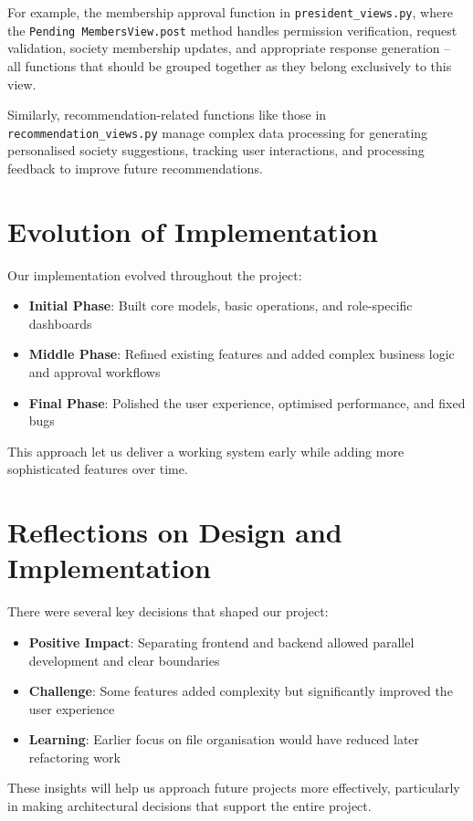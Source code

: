 For example, the membership approval function in \texttt{president\_views.py}, where the \texttt{Pending
MembersView.post} method handles permission verification, request validation, society membership updates, and appropriate response generation – all functions that should be grouped together as they belong exclusively to this view.

Similarly, recommendation-related functions like those in \texttt{recommendation\_views.py} manage complex data processing for generating personalised society suggestions, tracking user interactions, and processing feedback to improve future recommendations.

\section{Evolution of Implementation}

Our implementation evolved throughout the project:

\begin{itemize}
    \item \textbf{Initial Phase}: Built core models, basic operations, and role-specific dashboards
    \item \textbf{Middle Phase}: Refined existing features and added complex business logic and approval workflows
    \item \textbf{Final Phase}: Polished the user experience, optimised performance, and fixed bugs
\end{itemize}

This approach let us deliver a working system early while adding more sophisticated features over time.

\section{Reflections on Design and Implementation}

There were several key decisions that shaped our project:

\begin{itemize}
    \item \textbf{Positive Impact}: Separating frontend and backend allowed parallel development and clear boundaries
    \item \textbf{Challenge}: Some features added complexity but significantly improved the user experience
    \item \textbf{Learning}: Earlier focus on file organisation would have reduced later refactoring work
\end{itemize}

These insights will help us approach future projects more effectively, particularly in making architectural decisions that support the entire project.